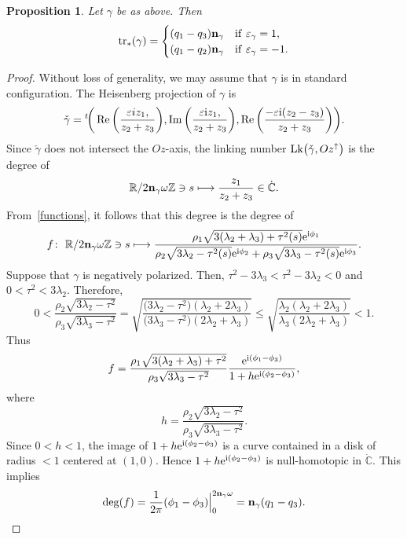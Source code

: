 \documentclass[10pt,a4paper]{amsart}
\numberwithin{equation}{section}
\newtheorem{Proposition}[Theorem]{Proposition}
 { \theoremstyle{definition}
\newtheorem{Definition}[Theorem]{Definition}
\newtheorem{Note}[Theorem]{Note}
\newtheorem{Example}[Theorem]{Example}
\newtheorem{Remark}[Theorem]{Remark} }
\def\C{\mathbb{C}}
\def\R{\mathbb{R}}
\def\Z{\mathbb{Z}}
\begin{document}
\begin{Proposition}
Let $\gamma$ be as above. Then
\[{\rm tr}_*(\gamma)=\begin{cases} (q_1-q_3){\bf n}_{\gamma} & {\rm if}\ \varepsilon_{\gamma}=1,\\
(q_1-q_2){\bf n}_{\gamma} & {\rm if}\ \varepsilon_{\gamma}=-1.
\end{cases}
\]
\end{Proposition}

\begin{proof}
Without loss of generality, we may assume that $\gamma$ is in standard configuration.
The Heisenberg projection of $\gamma$ is
\[
 \check{\gamma}={^t\!}\bigg(\operatorname{Re}\bigg(\frac{\varepsilon iz_1,}{z_2+z_3}\bigg),
 {\operatorname{Im}\bigg(\frac{\varepsilon {\rm i}z_1,}{z_2+z_3}\bigg)}, \operatorname{Re}\bigg(\frac{-\varepsilon {\rm i}(z_2-z_3)}{z_2+z_3}\bigg) \bigg).
\]
Since $\check{\gamma}$ does not intersect the $Oz$-axis, the linking number
${\rm Lk}\big(\check{\gamma},Oz^{\uparrow}\big)$ is the degree of
\[
 \R/2{\bf n}_{\gamma}\omega \Z \ni s \longmapsto \frac{z_1}{z_2+z_3}\in \dot{\C}.
\]
From~\eqref{functions}, it follows that this degree is the degree of
\[
 f\colon \ \R/2{\bf n}_{\gamma}\omega \Z\ni s\longmapsto
 \frac{\rho_1\sqrt{3(\lambda_2 + \lambda_3)+\tau^2(s)} {\rm e}^{{\rm i}\phi_1}}{\rho_2\sqrt{3\lambda_2-\tau^2(s)} {\rm e}^{{\rm i}\phi_2}+ \rho_3\sqrt{3\lambda_3-\tau^2(s)} {\rm e}^{{\rm i} \phi_3}}.
\]
Suppose that $\gamma$ is
negatively
polarized. Then, $\tau^2-3\lambda_3<\tau^2-3\lambda_2<0$ and $0<\tau^2<3\lambda_2$. Therefore,
\[
 0<\frac{\rho_2\sqrt{3\lambda_2-\tau^2}}{\rho_3\sqrt{3\lambda_3-\tau^2}}=
\sqrt{\frac{\big(3\lambda_2-\tau^2\big)(\lambda_2+2\lambda_3)}{\big(3\lambda_3-\tau^2\big)(2\lambda_2+\lambda_3)}}
\le \sqrt{\frac{\lambda_2(\lambda_2+2\lambda_3)}{\lambda_3(2\lambda_2+\lambda_3)}}<1.
\]
Thus
\[
 f= \frac{\rho_1\sqrt{3(\lambda_2 + \lambda_3)+\tau^2}}{\rho_3\sqrt{3\lambda_3-\tau^2}}
 \frac{{\rm e}^{{\rm i}(\phi_1-\phi_3)}}{1+h {\rm e}^{{\rm i}(\phi_2-\phi_3)}},
\]
where
\[
 h = \frac{\rho_2\sqrt{3\lambda_2-\tau^2}}{\rho_3\sqrt{3\lambda_3-\tau^2}}.
\]
Since $0<h<1$, the image of $1+h{\rm e}^{{\rm i}(\phi_2-\phi_3)}$
is a curve contained in a disk of radius $<1$ centered at $(1,0)$. Hence $1+h{\rm e}^{{\rm i}(\phi_2-\phi_3)}$ is null-homotopic in $\dot{\C}$. This implies
\[
 \deg (f)=\frac{1}{2\pi}(\phi_1-\phi_3)\Big|_0^{2{\bf n}_{\gamma}\omega} = {\bf n}_{\gamma}(q_1-q_3).
\]


\end{proof}
\end{document}

